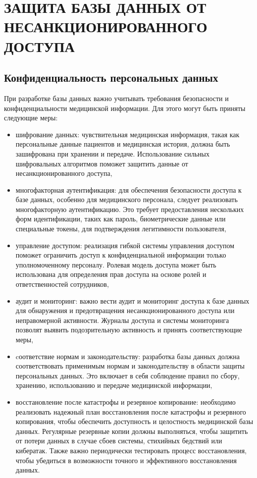 \section{ЗАЩИТА БАЗЫ ДАННЫХ ОТ НЕСАНКЦИОНИРОВАННОГО ДОСТУПА}

\subsection{Конфиденциальность персональных данных}

При разработке базы данных важно учитывать требования безопасности и конфиденциальности медицинской информации. Для этого могут быть приняты следующие меры:

\begin{itemize}
    \item шифрование данных: чувствительная медицинская информация, такая как персональные данные пациентов и медицинская история, должна быть зашифрована при хранении и передаче. Использование сильных шифровальных алгоритмов поможет защитить данные от несанкционированного доступа,
    \item многофакторная аутентификация: для обеспечения безопасности доступа к базе данных, особенно для медицинского персонала, следует реализовать многофакторную аутентификацию. Это требует предоставления нескольких форм идентификации, таких как пароль, биометрические данные или специальные токены, для подтверждения легитимности пользователя,
    \item управление доступом: реализация гибкой системы управления доступом поможет ограничить доступ к конфиденциальной информации только уполномоченному персоналу. Ролевая модель доступа может быть использована для определения прав доступа на основе ролей и ответственностей сотрудников,
    \item аудит и мониторинг: важно вести аудит и мониторинг доступа к базе данных для обнаружения и предотвращения несанкционированного доступа или неправомерной активности. Журналы доступа и системы мониторинга позволят выявить подозрительную активность и принять соответствующие меры,
    \item cоответствие нормам и законодательству: разработка базы данных должна соответствовать применимым нормам и законодательству в области защиты персональных данных. Это включает в себя соблюдение правил по сбору, хранению, использованию и передаче медицинской информации,
    \item восстановление после катастрофы и резервное копирование: необходимо реализовать надежный план восстановления после катастрофы и резервного копирования, чтобы обеспечить доступность и целостность медицинской базы данных. Регулярные резервные копии должны выполняться, чтобы защитить от потери данных в случае сбоев системы, стихийных бедствий или кибератак. Также важно периодически тестировать процесс восстановления, чтобы убедиться в возможности точного и эффективного восстановления данных.
    
\end{itemize}

